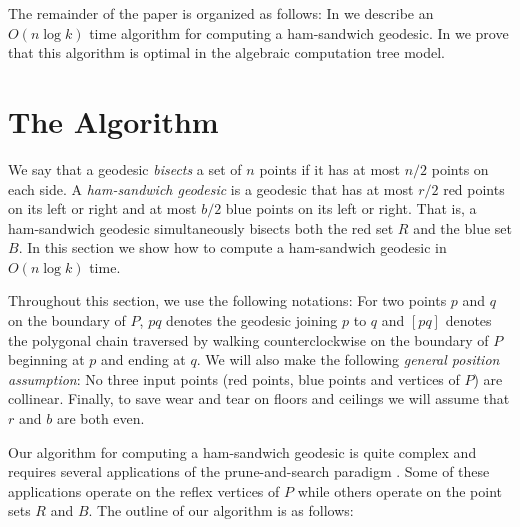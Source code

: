 \documentclass[charterfonts,lotsofwhite]{patmorin}
\newcommand{\chain}[2]{[#1#2]}
\begin{document}
The remainder of the paper is organized as follows:  In
 we describe an $O(n\log k)$ time algorithm for
computing a ham-sandwich geodesic.  In  we prove
that this algorithm is optimal in the algebraic computation tree
model.


\section{The Algorithm}

We say that a geodesic \emph{bisects} a set of $n$ points if it has
at most $n/2$ points on each side.  A \emph{ham-sandwich geodesic} is
a geodesic that has at most $r/2$ red points on its left or right and
at most $b/2$ blue points on its left or right.  That is, a
ham-sandwich geodesic simultaneously bisects both the red set $R$ and
the blue set $B$.  In this section we show how to compute a
ham-sandwich geodesic in $O(n\log k)$ time. 

Throughout this section, we use the following notations:  For two
points $p$ and $q$ on the boundary of $P$, $pq$ denotes the geodesic
joining $p$ to $q$ and $\chain{p}{q}$ denotes the polygonal chain
traversed by walking counterclockwise on the boundary of $P$ beginning
at $p$ and ending at $q$.  We will also make the following
\emph{general position assumption}:  No three input points (red
points, blue points and vertices of $P$) are collinear.  Finally, to
save wear and tear on floors and ceilings we will assume that $r$ and
$b$ are both even.

Our algorithm for computing a ham-sandwich geodesic is quite complex
and requires several applications of the prune-and-search paradigm
\cite{m83}.  Some of these applications operate on the reflex
vertices of $P$ while others operate on the point sets $R$ and $B$.
The outline of our algorithm is as follows:
\end{document}
